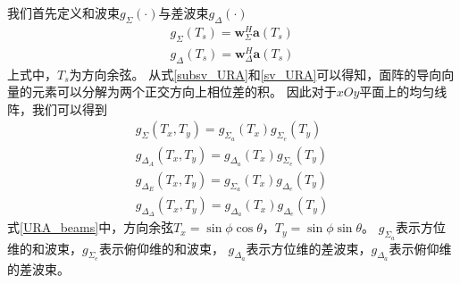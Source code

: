 \documentclass[master]{thesis-uestc}
\begin{document}
我们首先定义和波束$g_\Sigma(\cdot)$与差波束$g_\Delta(\cdot)$
\begin{subequations}\label{URA_sigma_delta_g}
    \begin{align}
        g_\Sigma(T_s) = \bm{w}^H_\Sigma\bm{a}(T_s)
        \\
        g_\Delta(T_s) = \bm{w}^H_\Delta\bm{a}(T_s)
    \end{align}
\end{subequations}
上式中，$T_s$为方向余弦。
从式\eqref{subsv_URA}和\eqref{sv_URA}可以得知，面阵的导向向量的元素可以分解为两个正交方向上相位差的积。
因此对于$xOy$平面上的均匀线阵，我们可以得到
\begin{subequations}\label{URA_beams}
    \begin{align}
        g_{\Sigma}\left(T_{x}, T_{y}\right)=g_{\Sigma_{a}}\left(T_{x}\right) g_{\Sigma_{e}}\left(T_{y}\right) \\
        g_{\Delta_{A}}\left(T_{x}, T_{y}\right)=g_{\Delta_{a}}\left(T_{x}\right) g_{\Sigma_{e}}\left(T_{y}\right) \\
        g_{\Delta_{E}}\left(T_{x}, T_{y}\right)=g_{\Sigma_{a}}\left(T_{x}\right) g_{\Delta_{e}}\left(T_{y}\right) \\
        g_{\Delta_{\Delta}}\left(T_{x}, T_{y}\right)=g_{\Delta_{a}}\left(T_{x}\right) g_{\Delta_{e}}\left(T_{y}\right)
    \end{align}
\end{subequations}
式\eqref{URA_beams}中，方向余弦$T_x=\sin\phi\cos\theta$，$T_y=\sin\phi\sin\theta$。
$g_{\Sigma_{a}}$表示方位维的和波束，$g_{\Sigma_{e}}$表示俯仰维的和波束，
$g_{\Delta_{a}}$表示方位维的差波束，$g_{\Delta_{a}}$表示俯仰维的差波束。
\end{document}
